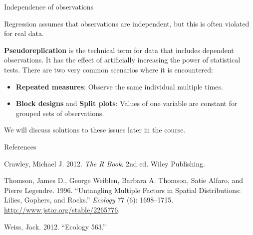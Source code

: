 \documentclass[
  ignorenonframetext,
]{beamer}
\providecommand{\tightlist}{%
  \setlength{\itemsep}{0pt}\setlength{\parskip}{0pt}}
\begin{document}
\begin{frame}{Independence of observations}
\protect\hypertarget{independence-of-observations}{}

Regression assumes that observations are independent, but this is often
violated for real data.

\textbf{Pseudoreplication} is the technical term for data that includes
dependent observations. It has the effect of artificially increasing the
power of statistical tests. There are two very common scenarios where it
is encountered:

\begin{itemize}
\tightlist
\item
  \textbf{Repeated measures}: Observe the same individual multiple
  times.
\item
  \textbf{Block designs} and \textbf{Split plots}: Values of one
  variable are constant for grouped sets of observations.
\end{itemize}

We will discuss solutions to these issues later in the course.

\end{frame}

\begin{frame}{References}
\protect\hypertarget{references}{}

\hypertarget{refs}{}
\leavevmode\hypertarget{ref-crawley}{}%
Crawley, Michael J. 2012. \emph{The R Book}. 2nd ed. Wiley Publishing.

\leavevmode\hypertarget{ref-lily}{}%
Thomson, James D., George Weiblen, Barbara A. Thomson, Satie Alfaro, and
Pierre Legendre. 1996. ``Untangling Multiple Factors in Spatial
Distributions: Lilies, Gophers, and Rocks.'' \emph{Ecology} 77 (6):
1698--1715. \url{http://www.jstor.org/stable/2265776}.

\leavevmode\hypertarget{ref-weiss}{}%
Weiss, Jack. 2012. ``Ecology 563.''

\end{frame}
\end{document}

